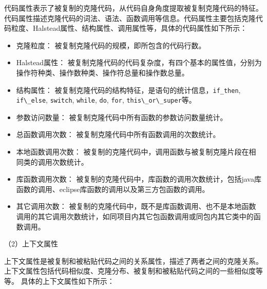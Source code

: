 代码属性表示了被复制的克隆代码，从代码自身角度提取被复制克隆代码的特征。代码属性描述克隆代码的词法、语法、函数调用等信息。代码属性主要包括克隆代码粒度、Halstead属性、结构属性、调用属性等，具体的代码属性如下所示：
\begin{itemize}
\item 
克隆粒度：
被复制克隆代码的规模，即所包含的代码行数。
\item 
Halstead属性：
被复制克隆代码的代码复杂度，有四个基本的属性值，分别为操作符种类、操作数种类、操作符总量和操作数总量。
\item  
结构属性：
被复制克隆代码的结构特征，是语句的统计信息，\verb+if_then+, \verb+if\_else+, \verb+switch+, \verb+while+, \verb+do+, \verb+for+,  \verb+this\_or\_super+等。
\item  
参数访问数量：
被复制克隆代码中所有函数的参数访问数量统计。
\item  
总函数调用次数：
被复制克隆代码中所有函数调用的次数统计。
\item  
本地函数调用次数：
被复制的克隆代码中，调用函数与被复制克隆片段在相同类的调用次数统计。
\item  
库函数调用次数：
被复制的克隆代码中，库函数的调用次数统计，包括java库函数的调用、eclipse库函数的调用以及第三方包函数的调用。
\item  
其它调用次数：
被复制的克隆代码中，既不是库函数调用、也不是本地函数调用的其它调用次数统计，如同项目内其它包函数调用或同包内其它类中的函数调用。
\end{itemize}

（2）上下文属性

上下文属性是被复制和被粘贴代码之间的关系属性，描述了两者之间的克隆关系。上下文属性包括代码相似度、克隆分布、被复制和被粘贴代码之间的一些相似度等等。
具体的上下文属性如下所示：

